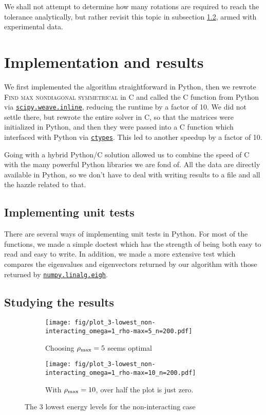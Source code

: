 \documentclass[a4paper]{article}
\begin{document}
We shall not attempt to determine how many rotations are required to reach the tolerance analytically, but rather revisit this topic in subsection \ref{subsec:studying_the_results}, armed with experimental data.

\section{Implementation and results}\label{sec:implementation_and_results}

We first implemented the algorithm straightforward in Python, then we rewrote \textsc{Find max nondiagonal symmetrical} in C and called the C function from Python via \href{http://docs.scipy.org/doc/scipy/reference/generated/scipy.weave.inline.html}{\texttt{scipy.weave.inline}}, reducing the runtime by a factor of 10. We did not settle there, but rewrote the entire solver in C, so that the matrices were initialized in Python, and then they were passed into a C function which interfaced with Python via \href{https://docs.python.org/2/library/ctypes.html}{\texttt{ctypes}}. This led to another speedup by a factor of 10.

Going with a hybrid Python/C solution allowed us to combine the speed of C with the many powerful Python libraries we are fond of. All the data are directly available in Python, so we don't have to deal with writing results to a file and all the hazzle related to that.

\subsection{Implementing unit tests}
There are several ways of implementing unit tests in Python. For most of the functions, we made a simple doctest which has the strength of being both easy to read and easy to write. In addition, we made a more extensive test which compares the eigenvalues and eigenvectors returned by our algorithm with those returned by \href{http://docs.scipy.org/doc/numpy/reference/generated/numpy.linalg.eigh.html}{\texttt{numpy.linalg.eigh}}.

\subsection{Studying the results}\label{subsec:studying_the_results}
\begin{figure}[ht]
\begin{subfigure}[t]{0.5\textwidth}
\texttt{[image: fig/plot\_3-lowest\_non-interacting\_omega=1\_rho-max=5\_n=200.pdf]}
\caption{Choosing ${\rho_{\mathrm{max}}} = 5$ seems optimal}
\end{subfigure}
\begin{subfigure}[t]{0.5\textwidth}
\texttt{[image: fig/plot\_3-lowest\_non-interacting\_omega=1\_rho-max=10\_n=200.pdf]}
\caption{With ${\rho_{\mathrm{max}}} = 10$, over half the plot is just zero.}
\end{subfigure}
\caption{The 3 lowest energy levels for the non-interacting case}
\label{fig:non-interacting_compare_rho_max}
\end{figure}
\end{document}
